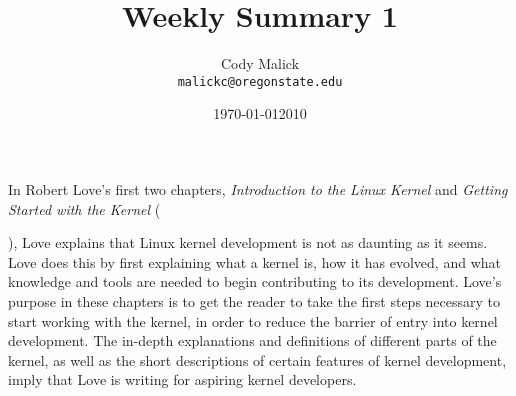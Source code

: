 \documentclass[10pt,letterpaper]{article}
\begin{document}
  \title{Weekly Summary 1}
  \author{Cody Malick\\
  \texttt{malickc@oregonstate.edu}}
  \date{\today}
  \maketitle

    In Robert Love's first two chapters, \textit{Introduction to the Linux
    Kernel} and \textit{Getting Started with the Kernel} (\date{2010}), Love
    explains that Linux kernel development is not as daunting as it seems.
    Love does this by first explaining what a kernel is, how it has evolved, and
    what knowledge and tools are needed to begin contributing to its
    development. Love's purpose in these chapters is to get the reader to take
    the first steps necessary to start working with the kernel, in order to
    reduce the barrier of entry into kernel development. The in-depth
    explanations and definitions of different parts of the kernel, as well
    as the short descriptions of certain features of kernel development, imply
    that Love is writing for aspiring kernel developers.
\end{document}
